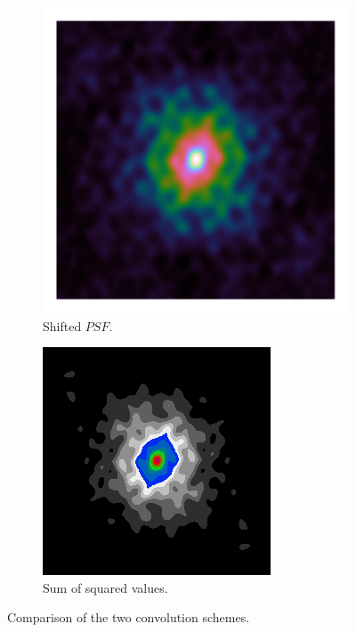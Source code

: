 \begin{figure}[h]
	\centering
	\begin{subfigure}[b]{0.3\linewidth}
		\includegraphics[width=\linewidth, clip, trim= 0.25in 0.25in 0.25in 0.25in]{./chapters/03.cd/simulated/psf.png}
		\caption{Shifted $PSF$.}
		\label{cd:efficient:lipschitz:padded}
	\end{subfigure}
	\begin{subfigure}[b]{0.3\linewidth}
		\includegraphics[width=\linewidth]{./chapters/03.distribution/simulated/psf.png}
		\caption{Sum of squared values.}
		\label{cd:efficient:lipschitz:rectangle}
	\end{subfigure}
	\caption{Comparison of the two convolution schemes.}
	\label{cd:efficient:lipschitz:figure}
\end{figure}

